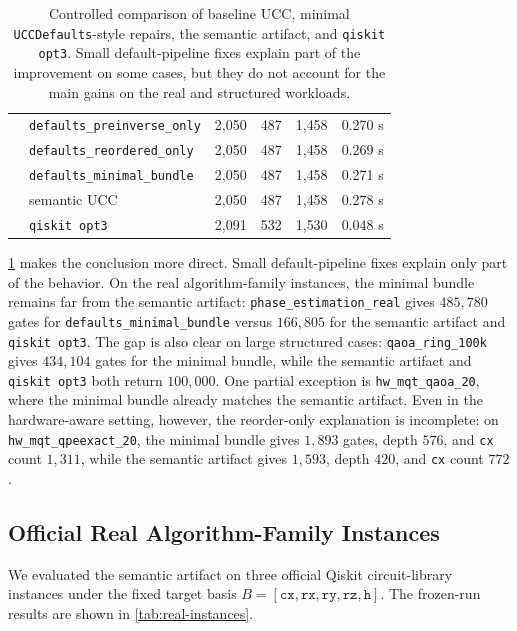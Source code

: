 \documentclass[11pt]{article}
\begin{document}
\begin{table}[t]
\begin{tabular}{llrrrr}
  & \texttt{defaults\_preinverse\_only} & 2{,}050 & 487 & 1{,}458 & 0.270 s \\
  & \texttt{defaults\_reordered\_only} & 2{,}050 & 487 & 1{,}458 & 0.269 s \\
  & \texttt{defaults\_minimal\_bundle} & 2{,}050 & 487 & 1{,}458 & 0.271 s \\
  & semantic UCC & 2{,}050 & 487 & 1{,}458 & 0.278 s \\
  & \texttt{qiskit opt3} & 2{,}091 & 532 & 1{,}530 & 0.048 s \\
\bottomrule
\end{tabular}
\caption{Controlled comparison of baseline UCC, minimal \texttt{UCCDefaults}-style repairs, the semantic artifact, and \texttt{qiskit opt3}. Small default-pipeline fixes explain part of the improvement on some cases, but they do not account for the main gains on the real and structured workloads.}
\label{tab:defaults-vs-full}
\end{table}

\cref{tab:defaults-vs-full} makes the conclusion more direct. Small
default-pipeline fixes explain only part of the behavior. On the real
algorithm-family instances, the minimal bundle remains far from the semantic
artifact: \texttt{phase\_estimation\_real} gives $485{,}780$ gates for
\texttt{defaults\_minimal\_bundle} versus $166{,}805$ for the semantic artifact
and \texttt{qiskit opt3}. The gap is also clear on large structured cases:
\texttt{qaoa\_ring\_100k} gives $434{,}104$ gates for the minimal bundle, while
the semantic artifact and \texttt{qiskit opt3} both return $100{,}000$. One
partial exception is \texttt{hw\_mqt\_qaoa\_20}, where the minimal bundle already
matches the semantic artifact. Even in the hardware-aware setting, however, the
reorder-only explanation is incomplete: on \texttt{hw\_mqt\_qpeexact\_20}, the
minimal bundle gives $1{,}893$ gates, depth $576$, and \texttt{cx} count
$1{,}311$, while the semantic artifact gives $1{,}593$, depth $420$, and
\texttt{cx} count $772$.

\subsection{Official Real Algorithm-Family Instances}

We evaluated the semantic artifact on three official Qiskit circuit-library instances under the fixed target basis $B = [\texttt{cx},\texttt{rx},\texttt{ry},\texttt{rz},\texttt{h}]$. The frozen-run results are shown in \cref{tab:real-instances}.
\end{document}

